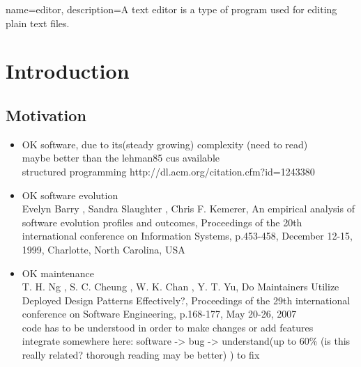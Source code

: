

{
  name={editor},
  description={A text editor is a type of program used for editing plain text files.}
}

\chapter{Introduction}

\section{Motivation}

\begin{itemize}

\item OK software, due to its(steady growing) complexity \cite{Lehman:1985:PEP:7261}(need to read) \\ maybe better than the lehman85 cus available \cite{Lehman:2003:SEB:950401.950407} \\ structured programming http://dl.acm.org/citation.cfm?id=1243380
	
\item OK software evolution \\
	Evelyn Barry , Sandra Slaughter , Chris F. Kemerer, An empirical analysis of software evolution profiles and outcomes, Proceedings of the 20th international conference on Information Systems, p.453-458, December 12-15, 1999, Charlotte, North Carolina, USA

\item OK maintenance \cite{Lientz:1980:SMM:601062} \cite{ISOSWMaintainance} \\
	T. H. Ng , S. C. Cheung , W. K. Chan , Y. T. Yu, Do Maintainers Utilize Deployed Design Patterns Effectively?, Proceedings of the 29th international conference on Software Engineering, p.168-177, May 20-26, 2007 \\
	code has to be understood \cite{Boehm:1976:SE:1311958.1312684} in order to make changes or add features \cite{Singer97anexamination} \\
	integrate somewhere here: software -> bug -> understand(up to 60\% \cite{Basili:1997:EPR:257260.257262}(is this really related? thorough reading may be better) \cite{Pigoski:1996:PSM:524398} ) to fix
\end{itemize}

